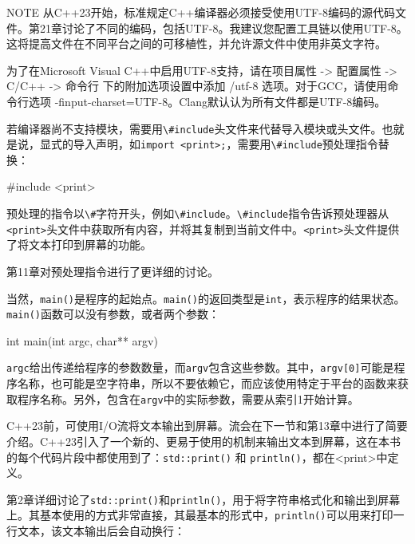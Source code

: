 \begin{myNotic}{NOTE}
从C++23开始，标准规定C++编译器必须接受使用UTF-8编码的源代码文件。第21章讨论了不同的编码，包括UTF-8。我建议您配置工具链以使用UTF-8。这将提高文件在不同平台之间的可移植性，并允许源文件中使用非英文字符。

为了在Microsoft Visual C++中启用UTF-8支持，请在项目属性 -> 配置属性 -> C/C++ -> 命令行 下的附加选项设置中添加 /utf-8 选项。对于GCC，请使用命令行选项 -finput-charset=UTF-8。Clang默认认为所有文件都是UTF-8编码。
\end{myNotic}


若编译器尚不支持模块，需要用\verb|\#include|头文件来代替导入模块或头文件。也就是说，显式的导入声明，如\verb|import <print>;|，需要用\verb|\#include|预处理指令替换：

\begin{cpp}
#include <print>
\end{cpp}

预处理的指令以\verb|\#|字符开头，例如\verb|\#include|。\verb|\#include|指令告诉预处理器从\verb|<print>|头文件中获取所有内容，并将其复制到当前文件中。\verb|<print>|头文件提供了将文本打印到屏幕的功能。

第11章对预处理指令进行了更详细的讨论。


当然，\verb|main()|是程序的起始点。\verb|main()|的返回类型是\verb|int|，表示程序的结果状态。\verb|main()|函数可以没有参数，或者两个参数：

\begin{cpp}
int main(int argc, char** argv)
\end{cpp}

\verb|argc|给出传递给程序的参数数量，而\verb|argv|包含这些参数。其中，\verb|argv[0]|可能是程序名称，也可能是空字符串，所以不要依赖它，而应该使用特定于平台的函数来获取程序名称。另外，包含在\verb|argv|中的实际参数，需要从索引1开始计算。



C++23前，可使用I/O流将文本输出到屏幕。流会在下一节和第13章中进行了简要介绍。C++23引入了一个新的、更易于使用的机制来输出文本到屏幕，这在本书的每个代码片段中都使用到了：\verb|std::print()| 和 \verb|println()|，都在<print>中定义。

第2章详细讨论了\verb|std::print()|和\verb|println()|，用于将字符串格式化和输出到屏幕上。其基本使用的方式非常直接，其最基本的形式中，\verb|println()|可以用来打印一行文本，该文本输出后会自动换行：

